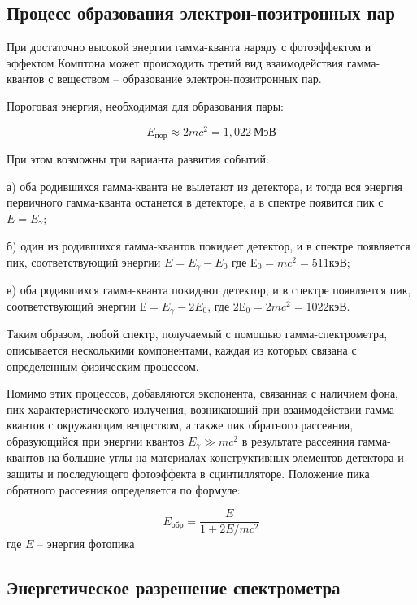 \documentclass[a4paper, 12pt]{article}
\begin{document}
        \subsection{Процесс образования электрон-позитронных пар}

            При достаточно высокой энергии гамма-кванта наряду с фотоэффектом и эффектом Комптона может происходить третий вид взаимодействия гамма-квантов с веществом -- образование электрон-позитронных пар.

            Пороговая энергия, необходимая для образования пары:

            $$
                E_{пор} \approx 2mc^2 = 1,022~МэВ
            $$

            При этом возможны три варианта развития событий:

            а) оба родившихся гамма-кванта не вылетают из детектора, и тогда вся энергия первичного гамма-кванта останется в детекторе, а в спектре появится пик с $E = E_{\gamma}$;

            б) один из родившихся гамма-квантов покидает детектор, и в спектре появляется пик, соответствующий энергии $E = E_{\gamma} - E_0$ где $Е_0 = mc^2 = 511 кэВ$;

            в) оба родившихся гамма-кванта покидают детектор, и в спектре появляется пик, соответствующий энергии $Е = E_{\gamma} - 2E_0$, где $2Е_0 = 2mc^2 = 1022 кэВ$.

        Таким образом, любой спектр, получаемый с помощью гамма-спектрометра, описывается несколькими компонентами, каждая из которых связана с определенным физическим процессом.

        Помимо этих процессов, добавляются экспонента, связанная с наличием фона, пик характеристического излучения, возникающий при взаимодействии гамма-квантов с окружающим веществом, а также пик обратного рассеяния, образующийся при энергии квантов $E_{\gamma} \gg mc^2$ в результате рассеяния гамма-квантов на большие углы на материалах конструктивных элементов детектора и защиты и последующего фотоэффекта в сцинтилляторе. Положение пика обратного рассеяния определяется по формуле:

        $$
            E_{обр} = \frac{E}{1 + 2E/mc^2}
        $$
        где $E$ -- энергия фотопика

        \subsection{Энергетическое разрешение спектрометра}
\end{document}
